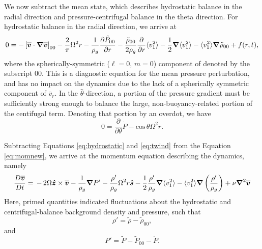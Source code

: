 We now subtract the mean state, which describes hydrostatic balance in the radial direction and pressure-centrifugal balance in the theta direction.   For hydrostatic balance in the radial direction, we arrive at
\begin{equation}
\label{eq:hydrostatic}
0   =  - \left[\vvecbar\cdot\boldsymbol{\nabla}\vvecbar\right]_{00}
- \frac{2}{\pi}\Omega^2r
-\frac{1}{\rho_g}\frac{\partial \tilde{P}_{00}}{\partial r}  %
						        - \frac{\tilde{\rho}_{00}}{2\rho_g}\frac{\partial }{\partial r}\langle v_1^2\rangle
                                - \frac{1}{2}\boldsymbol{\nabla}\langle v_1^2\rangle
							- \langle v_1^2\rangle\boldsymbol{\nabla}\tilde{\rho}_{00}
							+ f(r,t),
\end{equation}
where the spherically-symmetric ($\ell=0$, $m=0$) component of denoted by the subscript 00.  This is a diagnostic equation for the mean pressure perturbation, and has no impact on the dynamics due to the lack of a spherically symmetric component of $\overline{v}_r$.  In the ${\hat{\theta}}$-direction, a portion of the pressure gradient must be sufficiently strong enough to balance the large, non-buoyancy-related portion of the centifugal term.  Denoting that portion by an overdot, we have
\begin{equation}
\label{eq:twind}
0 = \frac{\partial }{\partial\theta}\dot{{P}} -\mathrm{cos}\,\theta\Omega^2r.
\end{equation}

Subtracting Equations \ref{eq:hydrostatic} and \ref{eq:twind} from the Equation \ref{eq:momnew}, we arrive at the momentum equation describing the dynamics, namely
\begin{equation}
\frac{ D \vvecbar }{D t}   =  
\,-\, 2\Omega\boldsymbol{\hat{z}}\times\vvecbar 
-\frac{1}{\rho_g}\boldsymbol{\nabla}P'  %
-\frac{\rho'}{\rho_g}\Omega^2r\boldsymbol{\hat{s}}
						        - \frac{1}{2}\frac{\rho'}{\rho_g}\boldsymbol{\nabla}\langle v_1^2\rangle
							- \langle v_1^2\rangle\boldsymbol{\nabla}\left(\frac{\rho'}{\rho_g}\right)
+ \nu\boldsymbol{\nabla}^2\vvecbar
\end{equation}
Here, primed quantities indicated fluctuations about the hydrostatic and centrifugal-balance background density and pressure, such that
\begin{equation}
\rho' = \tilde{\rho}-\tilde{\rho}_{00},
\end{equation}
and
\begin{equation}
P' = \tilde{P}-\tilde{P}_{00}-\dot{P}.
\end{equation}

